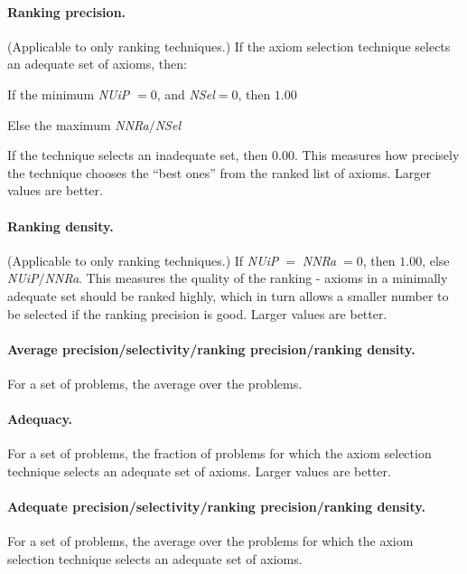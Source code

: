 \documentclass[]{ceurart}
\newenvironment{packed_itemize}{
\vspace*{-0.5em}
\begin{itemize}
  \setlength{\partopsep}{0pt}
  \setlength{\itemsep}{1pt}
  \setlength{\parskip}{0pt}
  \setlength{\parsep}{0pt}
}{\end{itemize}}
\begin{document}
\paragraph{Ranking precision.}
(Applicable to only ranking techniques.)
If the axiom selection technique selects an adequate set of axioms, then:
\begin{packed_itemize}
\item If the minimum \emph{NUiP} $= 0$, and \emph{NSel}$ = 0$, then $1.00$
\item Else the maximum \emph{NNRa}$/$\emph{NSel}
\end{packed_itemize}
If the technique selects an inadequate set, then $0.00$.
This measures how precisely the technique chooses the ``best ones'' from
the ranked list of axioms.
Larger values are better.

\paragraph{Ranking density.}
(Applicable to only ranking techniques.)
If \emph{NUiP}$\;=\;$\emph{NNRa}$\;= 0$, then $1.00$, else
\emph{NUiP}$/$\emph{NNRa}.
This measures the quality of the ranking - axioms in a minimally adequate 
set should be ranked highly, which in turn allows a smaller number to be 
selected if the ranking precision is good.
Larger values are better.

\paragraph{Average precision/selectivity/ranking precision/ranking density.}
For a set of problems, the average over the problems.

\paragraph{Adequacy.}
For a set of problems, the fraction of problems for which the axiom 
selection technique selects an adequate set of axioms.
Larger values are better.

\paragraph{Adequate precision/selectivity/ranking precision/ranking density.}
For a set of problems, the average over the problems for which the axiom
selection technique selects an adequate set of axioms.

\end{document}
